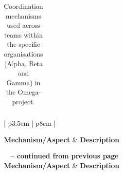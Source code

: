 \begin{center}
\begin{longtable}{| p{3.5cm} | p{8cm} |}
    \caption{Coordination mechanisms used across teams within the specific organisations (Alpha, Beta and Gamma) in the Omega-project.}
    \label{cmuasito}
    \end{longtable}
\end{center}

\begin{center}
    \begin{longtable}{| p{3.5cm} | p{8cm} |}
   
    \hline \textbf{Mechanism/Aspect} & \textbf{Description} \\ \hline
    \endfirsthead

{{\bfseries \tablename\ \thetable{} -- continued from previous page}} \\ \hline
    \textbf{Mechanism/Aspect} & \textbf{Description} \\ \hline
    \endhead

     \\ \hline
    \endfoot

   \endlastfoot 


\end{longtable}
\end{center}
